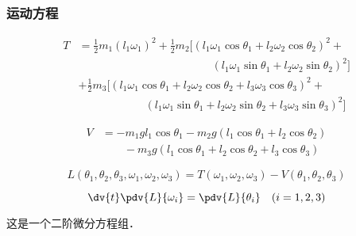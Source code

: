 \subsubsection{运动方程}
\begin{equation}
\begin{aligned}
T &= \frac{1}{2} m_1 (l_1 \omega_1)^2 + \frac{1}{2} m_2 [(l_1 \omega_1 \cos\theta_1 + l_2 \omega_2 \cos\theta_2)^2 +\\
&\qquad \qquad\qquad\qquad\qquad\qquad (l_1 \omega_1 \sin\theta_1 + l_2 \omega_2 \sin\theta_2)^2]\\
& + \frac{1}{2} m_3 [(l_1 \omega_1 \cos\theta_1 + l_2 \omega_2 \cos\theta_2 + l_3 \omega_3 \cos \theta_3)^2 +\\
&\qquad\qquad\qquad (l_1 \omega_1 \sin\theta_1 + l_2 \omega_2 \sin\theta_2 + l_3 \omega_3 \sin\theta_3)^2]
\end{aligned}
\end{equation}

\begin{equation} 
\begin{aligned} 
V &= -m_1 g l_1 \cos \theta_1 - m_2 g (l_1\cos \theta_1 + l_2 \cos \theta_2)\\
&\qquad - m_3 g (l_1 \cos\theta_1 + l_2 \cos \theta_2 + l_3 \cos \theta_3)
\end{aligned}
\end{equation}

\begin{equation}
L(\theta_1, \theta_2, \theta_3, \omega_1, \omega_2, \omega_3) = T(\omega_1, \omega_2, \omega_3) - V(\theta_1, \theta_2, \theta_3)
\end{equation}

\begin{equation}
\dv{t} \pdv{L}{\omega_i} = \pdv{L}{\theta_i} \quad (i=1,2,3)
\end{equation}

这是一个二阶微分方程组．


